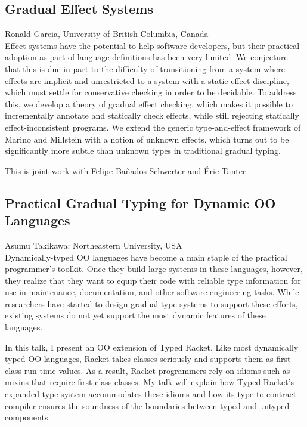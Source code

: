 \documentclass[11pt]{article}
\begin{document}
\subsection*{Gradual Effect Systems}
\noindent Ronald Garcia, University of British Columbia, Canada \\[0.5ex]

Effect systems have the potential to help software developers, but
their practical adoption as part of language definitions has been very
limited.  We conjecture that this is due in part to the difficulty of
transitioning from a system where effects are implicit and
unrestricted to a system with a static effect discipline, which must
settle for conservative checking in order to be decidable.  To address
this, we develop a theory of gradual effect checking, which makes it
possible to incrementally annotate and statically check effects, while
still rejecting statically effect-inconsistent programs.  We extend
the generic type-and-effect framework of Marino and Millstein with a
notion of unknown effects, which turns out to be significantly more
subtle than unknown types in traditional gradual typing.

This is joint work with Felipe Ba{\~n}ados Schwerter and {\'E}ric Tanter

\subsection*{Practical Gradual Typing for Dynamic OO Languages}
\noindent Asumu Takikawa: Northeastern University, USA \\[0.5ex]

Dynamically-typed OO languages have become a main staple of the
practical programmer's toolkit. Once they build large systems in these
languages, however, they realize that they want to equip their code
with reliable type information for use in maintenance, documentation,
and other software engineering tasks. While researchers have started
to design gradual type systems to support these efforts, existing
systems do not yet support the most dynamic features of these
languages.

In this talk, I present an OO extension of Typed Racket. Like most
dynamically typed OO languages, Racket takes classes seriously and
supports them as first-class run-time values. As a result, Racket
programmers rely on idioms such as mixins that require first-class
classes. My talk will explain how Typed Racket's expanded type system
accommodates these idioms and how its type-to-contract compiler
ensures the soundness of the boundaries between typed and untyped
components.
\end{document}
